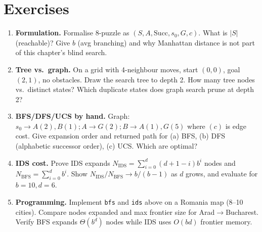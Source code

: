\section{Exercises}
\label{sec:ch02-exercises}
\begin{enumerate}[label=E2.\arabic*, leftmargin=*, itemsep=0.8em]
\item \textbf{Formulation.} Formalise 8-puzzle as $(S,A,\text{Succ},s_0,G,c)$. What is $|S|$ (reachable)? Give $b$ (avg branching) and why Manhattan distance is not part of this chapter's blind search.
\item \textbf{Tree vs.\ graph.} On a grid with 4-neighbour moves, start $(0,0)$, goal $(2,1)$, no obstacles. Draw the search tree to depth 2. How many tree nodes vs.\ distinct states? Which duplicate states does graph search prune at depth 2?
\item \textbf{BFS/DFS/UCS by hand.} Graph: $s_0\!\to\!A(2),B(1); A\!\to\!G(2); B\!\to\!A(1),G(5)$ where $(c)$ is edge cost. Give expansion order and returned path for (a) BFS, (b) DFS (alphabetic successor order), (c) UCS. Which are optimal?
\item \textbf{IDS cost.} Prove IDS expands $N_{\text{IDS}}=\sum_{i=0}^{d}(d+1-i)b^i$ nodes and $N_{\text{BFS}}=\sum_{i=0}^{d}b^i$. Show $N_{\text{IDS}}/N_{\text{BFS}}\to b/(b-1)$ as $d$ grows, and evaluate for $b=10,d=6$.
\item \textbf{Programming.} Implement \texttt{bfs} and \texttt{ids} above on a Romania map (8--10 cities). Compare nodes expanded and max frontier size for Arad$\to$Bucharest. Verify BFS expands $\Theta(b^d)$ nodes while IDS uses $O(bd)$ frontier memory.
\end{enumerate}
